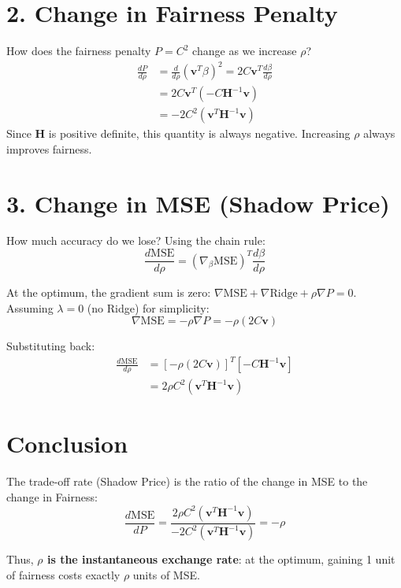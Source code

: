 \documentclass[11pt]{article}
\theoremstyle{plain}
\theoremstyle{definition}
\newcommand{\1}{\mathbf{1}}
\begin{document}
\section*{2. Change in Fairness Penalty}

How does the fairness penalty $P = C^2$ change as we increase $\rho$?
\begin{align*}
    \frac{dP}{d\rho} &= \frac{d}{d\rho} (\mathbf{v}^T \beta)^2 = 2C \mathbf{v}^T \frac{d\beta}{d\rho} \\
    &= 2C \mathbf{v}^T (-C \mathbf{H}^{-1} \mathbf{v}) \\
    &= \boxed{ -2C^2 (\mathbf{v}^T \mathbf{H}^{-1} \mathbf{v}) }
\end{align*}
Since $\mathbf{H}$ is positive definite, this quantity is always negative. Increasing $\rho$ always improves fairness.

\section*{3. Change in MSE (Shadow Price)}

How much accuracy do we lose? Using the chain rule:
$$ \frac{d\text{MSE}}{d\rho} = (\nabla_\beta \text{MSE})^T \frac{d\beta}{d\rho} $$

At the optimum, the gradient sum is zero: $\nabla \text{MSE} + \nabla \text{Ridge} + \rho \nabla P = 0$.
Assuming $\lambda=0$ (no Ridge) for simplicity:
$$ \nabla \text{MSE} = -\rho \nabla P = -\rho (2C \mathbf{v}) $$

Substituting back:
\begin{align*}
    \frac{d\text{MSE}}{d\rho} &= [-\rho (2C \mathbf{v})]^T [-C \mathbf{H}^{-1} \mathbf{v}] \\
    &= \boxed{ 2\rho C^2 (\mathbf{v}^T \mathbf{H}^{-1} \mathbf{v}) }
\end{align*}

\section*{Conclusion}

The trade-off rate (Shadow Price) is the ratio of the change in MSE to the change in Fairness:
$$ \frac{d\text{MSE}}{dP} = \frac{2\rho C^2 (\mathbf{v}^T \mathbf{H}^{-1} \mathbf{v})}{-2C^2 (\mathbf{v}^T \mathbf{H}^{-1} \mathbf{v})} = -\rho $$

Thus, \textbf{$\rho$ is the instantaneous exchange rate}: at the optimum, gaining 1 unit of fairness costs exactly $\rho$ units of MSE.
\end{document}
